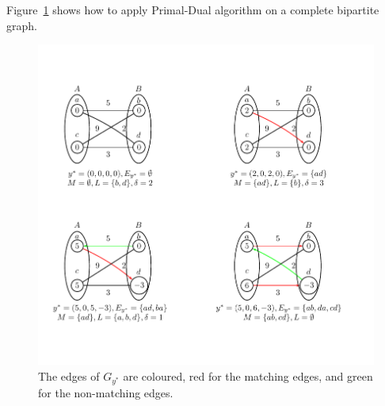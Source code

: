 Figure~\ref{fig:egprimaldual} shows how to apply Primal-Dual 
algorithm on a complete bipartite graph. 

\begin{figure}[htbp]
   \begin{center}
      \includegraphics{figures/egprimaldual.pdf}
   \end{center}
 \caption{The edges of $G_{y^*}$ are coloured, red for 
 the matching edges, and green for the non-matching edges.}
 \label{fig:egprimaldual}
\end{figure}

